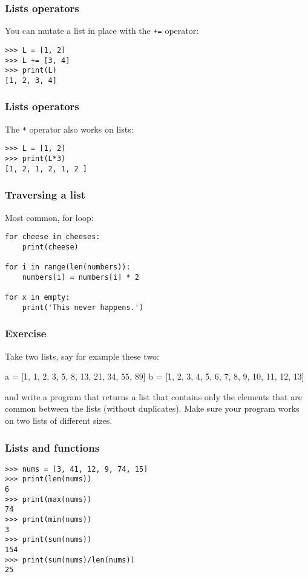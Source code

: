 \begin{frame}[fragile]\frametitle{Lists operators}
  You can mutate a list in place with the \texttt{+=} operator:
  \begin{lstlisting}
>>> L = [1, 2]
>>> L += [3, 4]
>>> print(L)
[1, 2, 3, 4]
  \end{lstlisting}
\end{frame}

\begin{frame}[fragile]\frametitle{Lists operators}
The \texttt{*} operator also works on lists:
  \begin{lstlisting}
>>> L = [1, 2]
>>> print(L*3)
[1, 2, 1, 2, 1, 2 ]
  \end{lstlisting}
\end{frame}

\begin{frame}[fragile]\frametitle{Traversing a list}
  Most common, for loop:
  \begin{lstlisting}
for cheese in cheeses:
    print(cheese)

for i in range(len(numbers)):
    numbers[i] = numbers[i] * 2
    
for x in empty:
	print('This never happens.')    
  \end{lstlisting}
\end{frame}



\begin{frame}[fragile]\frametitle{Exercise}
Take two lists, say for example these two:

  a = [1, 1, 2, 3, 5, 8, 13, 21, 34, 55, 89]
  b = [1, 2, 3, 4, 5, 6, 7, 8, 9, 10, 11, 12, 13]
  
and write a program that returns a list that contains only the elements that are common between the lists (without duplicates). Make sure your program works on two lists of different sizes.
\end{frame}

\begin{frame}[fragile]\frametitle{Lists and functions}
  \begin{lstlisting}
>>> nums = [3, 41, 12, 9, 74, 15]
>>> print(len(nums))
6
>>> print(max(nums))
74
>>> print(min(nums))
3
>>> print(sum(nums))
154
>>> print(sum(nums)/len(nums))
25
  \end{lstlisting}
\end{frame}


